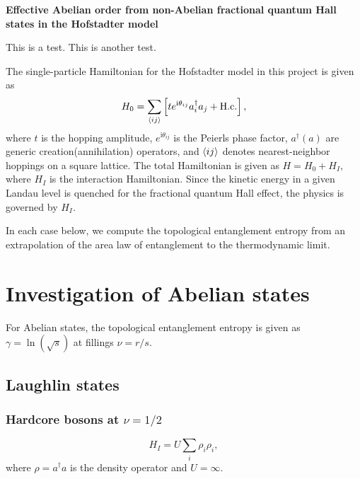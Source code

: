 \documentclass[floatfix,showpacs,amsmath,amsfonts,amssymb,aps,twocolumn, prb,groupedaddress]{revtex4-1}
\begin{document}
\onecolumngrid

\begin{center}
	\textbf{\large Effective Abelian order from non-Abelian fractional quantum Hall states in the Hofstadter model}
\end{center}
\vspace{-1em}
\tableofcontents
\vspace{1em}

This is a test.
This is another test.

The single-particle Hamiltonian for the Hofstadter model in this project is given as
\begin{equation}
\label{eq:single_ham}
H_0 = \sum_{\braket{ij}} \left[ t e^{\mathrm{i}\theta_{ij}} a_i^\dagger a_j + \text{H.c.} \right],
\end{equation}
where $t$ is the hopping amplitude, $e^{\mathrm{i}\theta_{ij}}$ is the Peierls phase factor, $a^\dagger(a)$ are generic creation(annihilation) operators, and $\braket{ij}$ denotes nearest-neighbor hoppings on a square lattice. The total Hamiltonian is given as $H=H_0+H_I$, where $H_I$ is the interaction Hamiltonian. Since the kinetic energy in a given Landau level is quenched for the fractional quantum Hall effect, the physics is governed by $H_I$.

In each case below, we compute the topological entanglement entropy from an extrapolation of the area law of entanglement to the thermodynamic limit.

\section{Investigation of Abelian states}

For Abelian states, the topological entanglement entropy is given as $\gamma=\ln(\sqrt{s})$ at fillings $\nu=r/s$.~\cite{Estienne15}

\subsection{Laughlin states}

\subsubsection{Hardcore bosons at $\nu=1/2$}

\begin{equation}
H_I = U \sum_i \rho_i \rho_i,
\end{equation}
where $\rho=a^\dagger a$ is the density operator and $U=\infty$.
\end{document}
